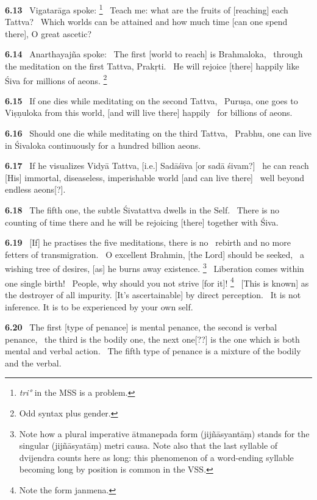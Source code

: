 \documentclass{article}
\newcommand{\skt}[1]{\textit{#1}}
\begin{document}
\textbf{6.13}%
\ Vigatarāga spoke:%
\footnote{\skt{tri°} in the MSS is a problem. }%
\ Teach me: what are the fruits of [reaching] each Tattva?%
\                Which worlds can be attained and how much time [can one spend there], O great ascetic?%


\textbf{6.14}%
\ Anarthayajña spoke:%
\ The first [world to reach] is Brahmaloka,%
\              through the meditation on the first Tattva, Prakṛti.%
\              He will rejoice [there] happily like Śiva for millions of aeons.%
\footnote{Odd syntax plus gender. }%


\textbf{6.15}%
\ If one dies while meditating on the second Tattva,%
\              Puruṣa, one goes to Viṣṇuloka from this world, [and will live there] happily%
\                 for billions of aeons.%


\textbf{6.16}%
\ Should one die while meditating on the third Tattva,%
\              Prabhu, one can live in Śivaloka continuously for a hundred billion aeons.%


\textbf{6.17}%
\ If he visualizes Vidyā Tattva, [i.e.] Sadāśiva [or sadā śivam?]%
\              he can reach [His] immortal, diseaseless, imperishable world [and can live there]%
\                 well beyond endless aeons[?].%


\textbf{6.18}%
\ The fifth one, the subtle Śivatattva dwells in the Self.%
\              There is no counting of time there and he will be rejoicing [there] together with Śiva.%


\textbf{6.19}%
\ [If] he practises the five meditations, there is no%
\                 rebirth and no more fetters of transmigration.%
\ O excellent Brahmin, [the Lord] should be seeked,%
\                  a wishing tree of desires, [as] he burns away existence.%
\footnote{Note how a plural imperative ātmanepada form (jijñāsyantāṃ) stands for the singular                (jijñāsyatāṃ) metri causa. Note also that the last syllable of                dvijendra counts here as long: this phenomenon of a word-ending                syllable becoming long by position is common in the VSS. }%
\ Liberation comes within one single birth!%
\              People, why should you not strive [for it]!%
\footnote{Note the form janmena. }%
\ [This is known] as the destroyer of all impurity. [It's ascertainable] by direct perception.%
\              It is not inference. It is to be experienced by your own self.%


\textbf{6.20}%
\ The first [type of penance] is mental penance, the second is verbal penance,%
\              the third is the bodily one, the next one[??] is the one which is both mental and verbal action.%
\              The fifth type of penance is a mixture of the bodily and the verbal.%
\end{document}
